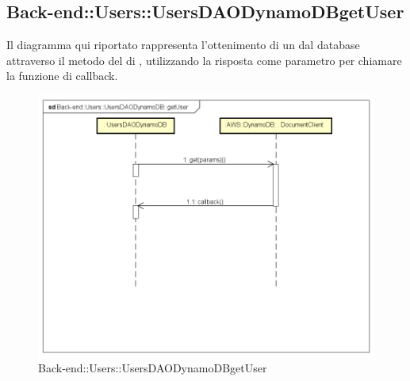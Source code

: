 \subsection{Back-end::Users::UsersDAODynamoDBgetUser}
Il diagramma qui riportato rappresenta l'ottenimento di un  dal database attraverso il metodo  del  di , utilizzando la risposta come parametro per chiamare la funzione di callback.
\begin{figure}[h] \centering \includegraphics[width=\textwidth,height=\textheight,keepaspectratio]{images/diagrams/back-end/Ufficial_Backend/Back-endUsersUsersDAODynamoDBgetUser.png} 	\caption{Back-end::Users::UsersDAODynamoDBgetUser}
\end{figure} 
\newpage
